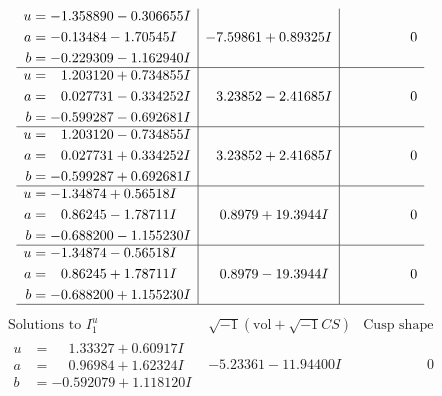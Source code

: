 \documentclass[1p]{elsarticle_modified}
\theoremstyle{definition}
\newcommand{\I}{\sqrt{-1}}
\begin{document}
$$\begin{array}{c|c|c}
\begin{aligned}
u &= -1.358890 - 0.306655 I \\
a &= -0.13484 - 1.70545 I \\
b &= -0.229309 - 1.162940 I\end{aligned}
 & -7.59861 + 0.89325 I & \phantom{-0.000000 } 0 \\ \hline\begin{aligned}
u &= \phantom{-}1.203120 + 0.734855 I \\
a &= \phantom{-}0.027731 - 0.334252 I \\
b &= -0.599287 - 0.692681 I\end{aligned}
 & \phantom{-}3.23852 - 2.41685 I & \phantom{-0.000000 } 0 \\ \hline\begin{aligned}
u &= \phantom{-}1.203120 - 0.734855 I \\
a &= \phantom{-}0.027731 + 0.334252 I \\
b &= -0.599287 + 0.692681 I\end{aligned}
 & \phantom{-}3.23852 + 2.41685 I & \phantom{-0.000000 } 0 \\ \hline\begin{aligned}
u &= -1.34874 + 0.56518 I \\
a &= \phantom{-}0.86245 - 1.78711 I \\
b &= -0.688200 - 1.155230 I\end{aligned}
 & \phantom{-}0.8979 + 19.3944 I & \phantom{-0.000000 } 0 \\ \hline\begin{aligned}
u &= -1.34874 - 0.56518 I \\
a &= \phantom{-}0.86245 + 1.78711 I \\
b &= -0.688200 + 1.155230 I\end{aligned}
 & \phantom{-}0.8979 - 19.3944 I & \phantom{-0.000000 } 0\\
 \hline 
 \end{array}$$\newpage$$\begin{array}{c|c|c}  
\text{Solutions to }I^u_{1}& \I (\text{vol} + \sqrt{-1}CS) & \text{Cusp shape}\\
 \hline 
\begin{aligned}
u &= \phantom{-}1.33327 + 0.60917 I \\
a &= \phantom{-}0.96984 + 1.62324 I \\
b &= -0.592079 + 1.118120 I\end{aligned}
 & -5.23361 - 11.94400 I & \phantom{-0.000000 } 0 \\ \hline\begin{aligned}

\end{aligned}
\end{array}$$
\end{document}
